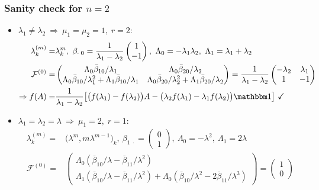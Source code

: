 \documentclass[12pt]{article}
\begin{document}
\subsubsection*{Sanity check for $n=2$}
\begin{itemize}
\item $\lambda_1 \neq \lambda_2\ \Rightarrow\ \mu_1 = \mu_2 = 1,\; r=2:$
\begin{align*}
\lambda_k^{(m)} =& \lambda_k^m,\ \beta_{\cdot\;0} = \frac 1{\lambda_1 - \lambda_2} \begin{pmatrix} 1\\-1 \end{pmatrix},\ \Lambda_0 = -\lambda_1\lambda_2,\ \Lambda_1 = \lambda_1 + \lambda_2\\
\mathcal F^{(0)} =& \begin{pmatrix} \Lambda_0\bar\beta_{10}/\lambda_1 & \Lambda_0\bar\beta_{20}/\lambda_2 \\ \Lambda_0\bar\beta_{10}/\lambda_1^2 + \Lambda_1\bar\beta_{10}/\lambda_1 & \Lambda_0\bar\beta_{20}/\lambda_2^2 + \Lambda_1\bar\beta_{20}/\lambda_2 \end{pmatrix} = \frac 1{\lambda_1 - \lambda_2} \begin{pmatrix} -\lambda_2 & \lambda_1 \\ 1 & -1 \end{pmatrix}\\
\Rightarrow f(A) =& \frac 1 {\lambda_1-\lambda_2}\big[ \big(f(\lambda_1) - f(\lambda_2)\big) A - \big(\lambda_2 f(\lambda_1) - \lambda_1 f(\lambda_2)\big) \mathbbm 1 \big]\ \checkmark
\end{align*}
\item $\lambda_1 = \lambda_2 = \lambda\ \Rightarrow\ \mu_1 = 2,\; r=1:$
\begin{align*}
\lambda_k^{(m)} =& \big(\lambda^m, m\lambda^{m-1}\big)_k,\ \beta_{1\;\cdot} = \begin{pmatrix} 0\\1 \end{pmatrix},\ \Lambda_0 = -\lambda^2,\ \Lambda_1 = 2\lambda\\
\mathcal F^{(0)} =& \begin{pmatrix} \Lambda_0 (\bar\beta_{10}/\lambda - \bar\beta_{11}/\lambda^2) \\ \Lambda_1 (\bar\beta_{10}/\lambda - \bar\beta_{11}/\lambda^2) + \Lambda_0 (\bar\beta_{10}/\lambda^2 - 2\bar\beta_{11}/\lambda^3) \end{pmatrix} = \begin{pmatrix} 1 \\ 0 \end{pmatrix}\\

\end{align*}
\end{itemize}
\end{document}
